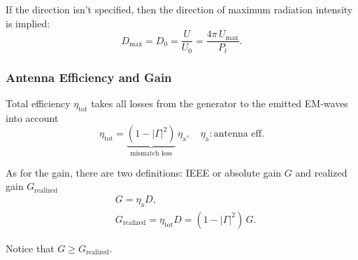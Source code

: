 If the direction isn't specified, then the direction of maximum radiation intensity is implied:
\begin{equation*}
D_{\mathrm{max}} = D_{0} = \dfrac{U}{U_{0}} = \dfrac{4\pi \, U_{\mathrm{max}}}{P_{t}}.
\end{equation*}

\subsubsection{Antenna Efficiency and Gain}
Total efficiency $\eta_{\mathrm{tot}}$ takes all losses from the generator to the emitted EM-waves into account
\begin{equation*}
  \eta_{{\mathrm{tot}}} = \underbrace{(1 - |\Gamma|^{2})}_{\text{mismatch loss}} \, \eta_{\mathrm{a}}, \quad \eta_{\mathrm{a}}:\text{antenna eff.}
\end{equation*}

As for the gain, there are two definitions: IEEE or absolute gain $G$ and realized gain $G_{\mathrm{realized}}$
\begin{align*}
  &G = \eta_{\mathrm{a}}D,\\
  &G_{\mathrm{realized}} = \eta_{\mathrm{tot}}D = (1 - |\Gamma|^{2})\,G.
\end{align*}

Notice that $G \geq G_{\mathrm{realized}}$.

